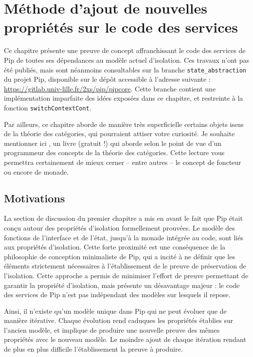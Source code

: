 \chapter{Méthode d'ajout de nouvelles propriétés sur le code des services}

	Ce chapitre présente une preuve de concept affranchissant le code des services de Pip de toutes ses dépendances au modèle actuel d'isolation. Ces travaux n'ont pas été publiés, mais sont néanmoins consultables sur la branche \texttt{state\_abstraction} du projet Pip, disponible sur le dépôt accessible à l'adresse suivante : \url{https://gitlab.univ-lille.fr/2xs/pip/pipcore}. Cette branche contient une implémentation imparfaite des idées exposées dans ce chapitre, et restreinte à la fonction \texttt{switchContextCont}.

	Par ailleurs, ce chapitre aborde de manière très superficielle certains objets issus de la théorie des catégories, qui pourraient attiser votre curiosité. Je souhaite mentionner ici \cite{categorytheoryforprogrammers}, un livre (gratuit !) qui aborde selon le point de vue d'un programmeur des concepts de la théorie des catégories. Cette lecture vous permettra certainement de mieux cerner -- entre autres -- le concept de foncteur ou encore de monade.

	\section{Motivations}

	La section de discussion du premier chapitre a mis en avant le fait que Pip était conçu autour des propriétés d'isolation formellement prouvées. Le modèle des fonctions de l'interface et de l'état, jusqu'à la monade intégrée au code, sont liés aux propriétés d'isolation. Cette forte proximité est une conséquence de la philosophie de conception minimaliste de Pip, qui a incité à ne définir que les éléments strictement nécessaires à l'établissement de le preuve de préservation de l'isolation. Cette approche a permis de minimiser l'effort de preuve permettant de garantir la propriété d'isolation, mais présente un désavantage majeur : le code des services de Pip n'est pas indépendant des modèles sur lesquels il repose.

	Ainsi, il n'existe qu'un modèle unique dans Pip qui ne peut évoluer que de manière itérative. Chaque évolution rend caduques les propriétés établies sur l'ancien modèle, et implique de produire une nouvelle preuve des mêmes propriétés avec le nouveau modèle. Le moindre ajout de chaque itération rendant de plus en plus difficile l'établissement la preuve à produire.


